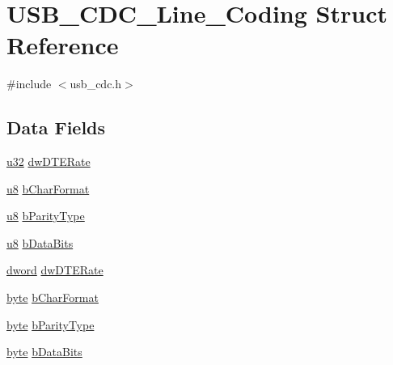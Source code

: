 \hypertarget{struct_u_s_b___c_d_c___line___coding}{\section{U\-S\-B\-\_\-\-C\-D\-C\-\_\-\-Line\-\_\-\-Coding Struct Reference}
\label{struct_u_s_b___c_d_c___line___coding}
}


{\ttfamily \#include $<$usb\-\_\-cdc.\-h$>$}

\subsection*{Data Fields}
\begin{DoxyCompactItemize}
\item 
\hyperlink{p8_2pinguino_2core_2typedef_8h_a2caf5cd7bcdbe1eefa727f44ffb10bac}{u32} \hyperlink{struct_u_s_b___c_d_c___line___coding_a0880b491e21b4049653c96c27616ede0}{dw\-D\-T\-E\-Rate}
\item 
\hyperlink{p8_2pinguino_2core_2typedef_8h_aed742c436da53c1080638ce6ef7d13de}{u8} \hyperlink{struct_u_s_b___c_d_c___line___coding_a979573baf34aef2377f42c7457d234b0}{b\-Char\-Format}
\item 
\hyperlink{p8_2pinguino_2core_2typedef_8h_aed742c436da53c1080638ce6ef7d13de}{u8} \hyperlink{struct_u_s_b___c_d_c___line___coding_aa4bacb5291241e2a338b40c77d73ebd5}{b\-Parity\-Type}
\item 
\hyperlink{p8_2pinguino_2core_2typedef_8h_aed742c436da53c1080638ce6ef7d13de}{u8} \hyperlink{struct_u_s_b___c_d_c___line___coding_aad12e236e2d98e282eecda84c236d5bc}{b\-Data\-Bits}
\item 
\hyperlink{p8_2pinguino_2core_2typedef_8h_a74cb93d430006e784da73b8ca406ee6e}{dword} \hyperlink{struct_u_s_b___c_d_c___line___coding_ac40ee53801054ac7a2b11c4ab27842fa}{dw\-D\-T\-E\-Rate}
\item 
\hyperlink{p8_2pinguino_2core_2typedef_8h_a0c8186d9b9b7880309c27230bbb5e69d}{byte} \hyperlink{struct_u_s_b___c_d_c___line___coding_a4827b9804ae59af672c22c8f30c3b357}{b\-Char\-Format}
\item 
\hyperlink{p8_2pinguino_2core_2typedef_8h_a0c8186d9b9b7880309c27230bbb5e69d}{byte} \hyperlink{struct_u_s_b___c_d_c___line___coding_ad1ba20cae66624339b0301c4cd4fa8b0}{b\-Parity\-Type}
\item 
\hyperlink{p8_2pinguino_2core_2typedef_8h_a0c8186d9b9b7880309c27230bbb5e69d}{byte} \hyperlink{struct_u_s_b___c_d_c___line___coding_ad836f51a0b3eb4521d4448a22efe1dd3}{b\-Data\-Bits}
\end{DoxyCompactItemize}


